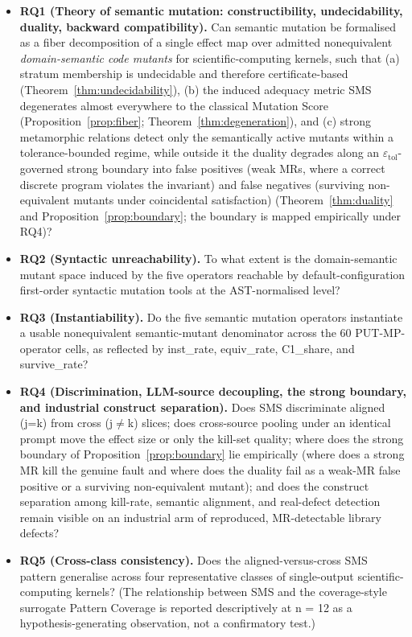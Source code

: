 \documentclass[manuscript,screen,review]{acmart}
\begin{document}
\begin{itemize}

\item
  \textbf{RQ1 (Theory of semantic mutation: constructibility,
  undecidability, duality, backward compatibility).} Can semantic
  mutation be formalised as a fiber decomposition of a single effect map
  over admitted nonequivalent \emph{domain-semantic code mutants} for
  scientific-computing kernels, such that (a) stratum membership is
  undecidable and therefore certificate-based (Theorem~\ref{thm:undecidability}), (b) the
  induced adequacy metric SMS degenerates almost everywhere to the
  classical Mutation Score (Proposition~\ref{prop:fiber}; Theorem~\ref{thm:degeneration}), and (c)
  strong metamorphic relations detect only the semantically active
  mutants within a tolerance-bounded regime, while outside it the duality
  degrades along an $\varepsilon_{\mathrm{tol}}$-governed strong boundary
  into false positives (weak MRs, where a correct discrete program
  violates the invariant) and false negatives (surviving non-equivalent
  mutants under coincidental satisfaction) (Theorem~\ref{thm:duality} and Proposition~\ref{prop:boundary};
  the boundary is mapped empirically under RQ4)?
\item
  \textbf{RQ2 (Syntactic unreachability).} To what extent is the
  domain-semantic mutant space induced by the five operators reachable
  by default-configuration first-order syntactic mutation tools at the
  AST-normalised level?
\item
  \textbf{RQ3 (Instantiability).} Do the five semantic mutation
  operators instantiate a usable nonequivalent semantic-mutant
  denominator across the 60 PUT-MP-operator cells, as reflected by
  inst\_rate, equiv\_rate, C1\_share, and survive\_rate?
\item
  \textbf{RQ4 (Discrimination, LLM-source decoupling, the strong boundary, and
  industrial construct separation).} Does SMS discriminate aligned (j=k) from
  cross (j$\neq$k) slices; does cross-source pooling under an identical prompt
  move the effect size or only the kill-set quality; where does the strong
  boundary of Proposition~\ref{prop:boundary} lie empirically (where does a
  strong MR kill the genuine fault and where does the duality fail as a weak-MR
  false positive or a surviving non-equivalent mutant); and does the construct
  separation among kill-rate, semantic alignment, and real-defect detection
  remain visible on an industrial arm of reproduced, MR-detectable library
  defects?
\item
  \textbf{RQ5 (Cross-class consistency).} Does the aligned-versus-cross
  SMS pattern generalise across four representative classes of
  single-output scientific-computing kernels? (The relationship between
  SMS and the coverage-style surrogate Pattern Coverage is reported
  descriptively at n = 12 as a hypothesis-generating observation, not a
  confirmatory test.)
\end{itemize}
\end{document}
